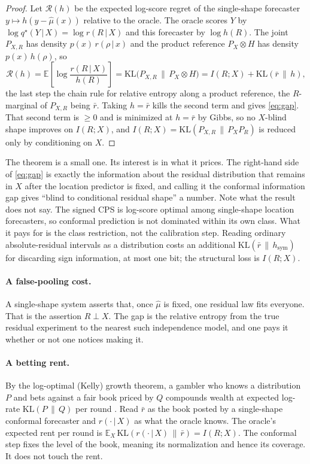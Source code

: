 \documentclass[11pt]{article}
\theoremstyle{definition}
\newcommand{\E}{\mathbb{E}}
\newcommand{\KL}{\mathrm{KL}}
\newcommand{\given}{\,\vert\,}
\begin{document}
\begin{proof}
Let $\mathcal{R}(h)$ be the expected log-score regret of the single-shape forecaster
$y\mapsto h(y-\hat\mu(x))$ relative to the oracle. The oracle scores $Y$ by
$\log q^\star(Y\given X)=\log r(R\given X)$ and this forecaster by $\log h(R)$. The joint
$P_{X,R}$ has density $p(x)\,r(\rho\given x)$ and the product reference $P_X\otimes H$ has
density $p(x)\,h(\rho)$, so
\begin{equation}\label{eq:master}
  \mathcal{R}(h)=\E\!\left[\log\frac{r(R\given X)}{h(R)}\right]
      =\KL\!\big(P_{X,R}\,\big\|\,P_X\otimes H\big)
      = I(R;X)+\KL(\bar r\,\|\,h),
\end{equation}
the last step the chain rule for relative entropy along a product reference, the $R$-marginal
of $P_{X,R}$ being $\bar r$. Taking $h=\bar r$ kills the second term and gives
\eqref{eq:gap}. That second term is $\ge 0$ and is minimized at $h=\bar r$ by Gibbs, so no
$X$-blind shape improves on $I(R;X)$, and $I(R;X)=\KL(P_{X,R}\,\|\,P_X P_R)$ is reduced only
by conditioning on $X$.
\end{proof}

The theorem is a small one. Its interest is in what it prices. The right-hand side of
\eqref{eq:gap} is exactly the information about the residual distribution that remains in
$X$ after the location predictor is fixed, and calling it the conformal information gap
gives ``blind to conditional residual shape'' a number. Note what the result does not say.
The signed CPS is log-score optimal among single-shape location forecasters, so conformal
prediction is not dominated within its own class. What it pays for is the class restriction,
not the calibration step. Reading ordinary absolute-residual intervals as a distribution
costs an additional $\KL(\bar r\,\|\,h_{\mathrm{sym}})$ for discarding sign information, at
most one bit; the structural loss is $I(R;X)$.

\paragraph{A false-pooling cost.} A single-shape system asserts that, once $\hat\mu$ is
fixed, one residual law fits everyone. That is the assertion $R\perp X$. The gap is the
relative entropy from the true residual experiment to the nearest such independence model,
and one pays it whether or not one notices making it.

\paragraph{A betting rent.} By the log-optimal (Kelly) growth theorem, a gambler who knows a
distribution $P$ and bets against a fair book priced by $Q$ compounds wealth at expected
log-rate $\KL(P\,\|\,Q)$ per round \citep{kelly1956new,cover2006elements}. Read $\bar r$ as
the book posted by a single-shape conformal forecaster and $r(\cdot\given X)$ as what the
oracle knows. The oracle's expected rent per round is
$\E_X\,\KL(r(\cdot\given X)\,\|\,\bar r)=I(R;X)$. The conformal step fixes the level of the
book, meaning its normalization and hence its coverage. It does not touch the rent.
\end{document}
